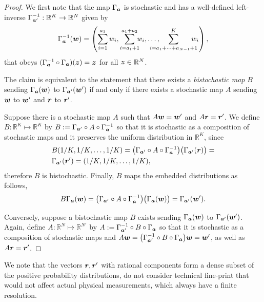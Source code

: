 \documentclass[pra,
aps,
twocolumn,
superscriptaddress,
groupedaddress,
nofootinbib,
reprint
]{revtex4-1}
\begin{document}
\begin{proof}
	We first note that the map $\Gamma_{\bm{a}}$ is stochastic and has a well-defined left-inverse $\Gamma^{-1}_{\bm{a}'}: \mathbb{R}^K \rightarrow \mathbb{R}^N$ given by
\begin{equation}
	\Gamma^{-1}_{\bma}(\w) = \left( \sum_{i=1}^{a_1} w_i,  \sum_{i = a_1 +1}^{a_1 + a_2} \hspace{-5pt} w_i, \dots , \hspace{-15pt} \sum_{i=a_1 + \dots + a_{N-1}+1}^{K} \hspace{-10pt} w_i \right),
\end{equation}
that obeys $(\Gamma^{-1}_{\bm{a}} \circ \Gamma_{\bm{a}}) (\bm{z}) = \bm{z}$ for all $\bm{z} \in \mathbb{R}^N$. 

The claim is equivalent to the statement that there exists a \emph{bistochastic map} $B$ sending $\Gamma_{\bm{a}}(\boldsymbol{w})$ to $\Gamma_{\bm{a}'}(\boldsymbol{w}')$ if and only if there exists a stochastic map $A$ sending $\boldsymbol{w}$ to $\boldsymbol{w}'$ and $\boldsymbol{r}$ to $\boldsymbol{r}'$.

Suppose there is a stochastic map $A$ such that $A\boldsymbol{w}=\boldsymbol{w}'$ and $A\boldsymbol{r} = \boldsymbol{r}'$. 
We define $B:\mathbb{R}^K \mapsto \mathbb{R}^K$ by $B := \Gamma_{\bm{a}'} \circ A \circ \Gamma_{\bm{a}}^{-1}$ so that it is stochastic as a composition of stochastic maps and it preserves the uniform distribution in $\mathbb{R}^K$, since
\begin{align}
	&B(1/K, 1/K, \dots, 1/K) = \big( \Gamma_{\bm{a}'} \circ A \circ \Gamma_{\bm{a}}^{-1} \big) \big( \Gamma_{\bm{a}'}(\boldsymbol{r}) \big) = \nonumber\\
	&\Gamma_{\bm{a}'} (\boldsymbol{r}') = (1/K, 1/K, \dots, 1/K),
\end{align}
therefore $B$ is bistochastic.
Finally, $B$ maps the embedded distributions as follows,
\begin{equation}
	B \Gamma_{\bm{a}}(\boldsymbol{w}) = \big( \Gamma_{\bm{a}'} \circ A \circ \Gamma_{\bm{a}}^{-1} \big) \big( \Gamma_{\bm{a}}(\boldsymbol{w}) \big) = \Gamma_{\bm{a}'} (\boldsymbol{w}').
\end{equation}

Conversely, suppose a bistochastic map $B$ exists sending $\Gamma_{\bm{a}}(\boldsymbol{w})$ to $\Gamma_{\bm{a}'}(\boldsymbol{w}')$. Again, define $A: \mathbb{R}^N \mapsto \mathbb{R}^{N'}$ by $A := \Gamma_{\bm{a}'}^{-1} \circ B \circ \Gamma_{\bm{a}}$ so that it is stochastic as a composition of stochastic maps and $A \boldsymbol{w} = \big( \Gamma_{\bm{a}'}^{-1} \circ B \circ \Gamma_{\bm{a}} \big) \boldsymbol{w} = \boldsymbol{w}'$, as well as $A \boldsymbol{r} = \boldsymbol{r}'$.
\end{proof}
We note that the vectors $\boldsymbol{r}, \boldsymbol{r}'$ with rational components form a dense subset of the positive probability distributions, do not consider technical fine-print that would not affect actual physical measurements, which always have a finite resolution.
\end{document}
